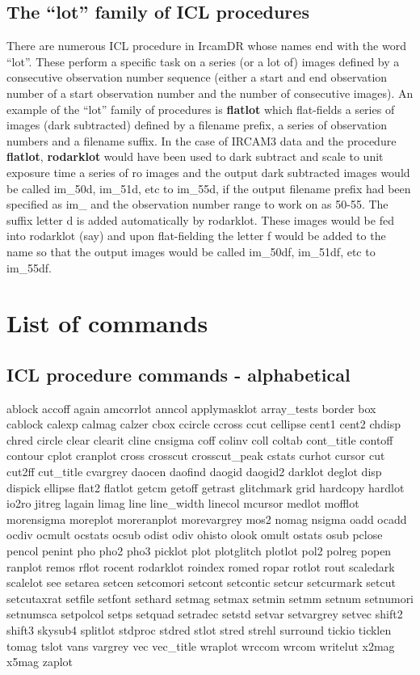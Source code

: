 \subsection{The ``lot'' family of ICL procedures}

There are numerous ICL procedure in {\sc IrcamDR} whose names end with
the word ``lot''.  These perform a specific task on a series (or a lot
of) images defined by a consecutive observation number sequence
(either a start and end observation number of a start observation
number and the number of consecutive images).  An example of the
``lot'' family of procedures is {\bf flatlot} which flat-fields a
series of images (dark subtracted) defined by a filename prefix, a
series of observation numbers and a filename suffix.  In the case of
{\sc IRCAM3} data and the procedure {\bf flatlot}, {\bf rodarklot} would
have been used to dark subtract and scale to unit exposure time a
series of ro images and the output dark subtracted images would be
called im\_50d, im\_51d, etc to im\_55d, if the output filename prefix
had been specified as im\_ and the observation number range to work on
as 50-55.  The suffix letter d is added automatically by rodarklot.
These images would be fed into rodarklot (say) and upon flat-fielding
the letter f would be added to the name so that the output images
would be called im\_50df, im\_51df, etc to im\_55df.

\section{List of commands}

\subsection{ICL procedure commands - alphabetical}

ablock accoff again amcorrlot anncol applymasklot array\_tests border box
cablock calexp calmag calzer cbox ccircle ccross ccut cellipse cent1
cent2 chdisp chred circle clear clearit cline cnsigma coff colinv coll
coltab cont\_title contoff contour cplot cranplot cross crosscut
crosscut\_peak cstats curhot cursor cut cut2ff cut\_title cvargrey daocen
daofind daogid daogid2 darklot deglot disp dispick ellipse flat2 flatlot
getcm getoff getrast glitchmark grid hardcopy hardlot io2ro jitreg lagain
limag line line\_width linecol mcursor medlot mofflot morensigma moreplot
moreranplot morevargrey mos2 nomag nsigma oadd ocadd ocdiv ocmult ocstats
ocsub odist odiv ohisto olook omult ostats osub pclose pencol penint pho
pho2 pho3 picklot plot plotglitch plotlot pol2 polreg popen ranplot remos
rflot rocent rodarklot roindex romed ropar rotlot rout scaledark scalelot
see setarea setcen setcomori setcont setcontic setcur setcurmark setcut
setcutaxrat setfile setfont sethard setmag setmax setmin setmm setnum
setnumori setnumsca setpolcol setps setquad setradec setstd setvar
setvargrey setvec shift2 shift3 skysub4 splitlot stdproc stdred stlot
stred strehl surround tickio ticklen tomag tslot vans vargrey vec
vec\_title wraplot wrccom wrcom writelut x2mag x5mag zaplot

